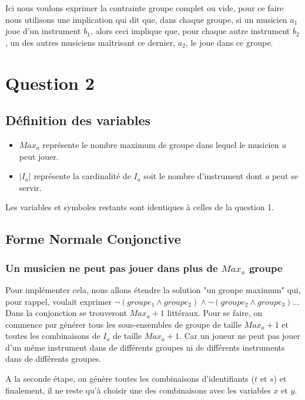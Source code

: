\documentclass[11pt]{article}
\begin{document}
Ici nous voulons exprimer la contrainte groupe complet ou vide, pour ce faire nous utilisons une implication qui dit que, dans chaque groupe, si un musicien $a_1$ joue d'un instrument $b_1$, alors ceci implique que, pour chaque autre instrument $b_2$, un des autres musiciens maîtrisant ce dernier, $a_2$, le joue dans ce groupe.

\section{Question 2}

\subsection{Définition des variables}

\begin{itemize}
\item $Max_a$ représente le nombre maximum de groupe dans lequel le musicien \textit{a} peut jouer.
\item $|I_a|$ représente la cardinalité de $I_a$ soit le nombre d'instrument dont \textit{a} peut se servir.
\end{itemize}

Les variables et symboles restants sont identiques à celles de la question 1.

\subsection{Forme Normale Conjonctive}

\subsubsection{Un musicien ne peut pas jouer dans plus de $Max_a$ groupe}

Pour implémenter cela, nous allons étendre la solution "un groupe maximum" qui, pour rappel, voulait exprimer $\neg (groupe_1 \wedge groupe_2) \wedge \neg (groupe_2 \wedge groupe_3) \ldots$
Dans la conjonction se trouveront $Max_a+1$ littéraux. Pour se faire, on commence par générer tous les sous-ensembles de groupe de taille $Max_a+1$ et toutes les combinaisons de $I_a$ de taille $Max_a+1$. Car un joueur ne peut pas jouer d'un même instrument dans de différents groupes ni de différents instruments dans de différents groupes. 

A la seconde étape, on génère toutes les combinaisons d'identifiants ($t$ et $s$) et finalement, il ne reste qu'à choisir une des combinaisons avec les variables $x$ et $y$.
\end{document}
